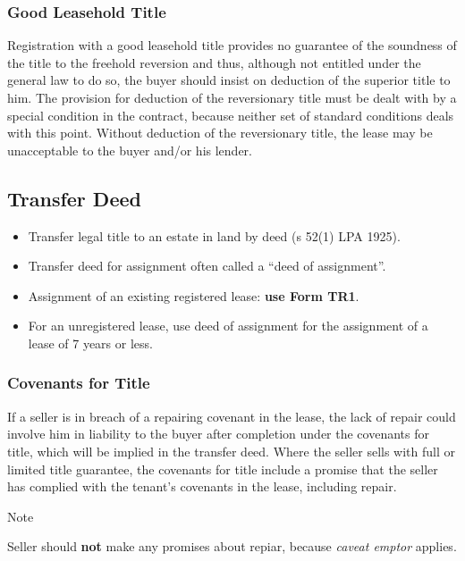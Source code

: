 \documentclass[
]{article}
\providecommand{\tightlist}{%
  \setlength{\itemsep}{0pt}\setlength{\parskip}{0pt}}
\newenvironment{env-ab94a4ec-2f9e-4d2f-94d1-74521d1a190e}
{
    \savenotes\tcolorbox[blanker,breakable,left=5pt,borderline west={2pt}{-4pt}{blue}]
}
{
    \endtcolorbox\spewnotes
}
\begin{document}
\hypertarget{good-leasehold-title}{%
\subsubsection{Good Leasehold Title}\label{good-leasehold-title}}

Registration with a good leasehold title provides no guarantee of the
soundness of the title to the freehold reversion and thus, although not
entitled under the general law to do so, the buyer should insist on
deduction of the superior title to him. The provision for deduction of
the reversionary title must be dealt with by a special condition in the
contract, because neither set of standard conditions deals with this
point. Without deduction of the reversionary title, the lease may be
unacceptable to the buyer and/or his lender.

\hypertarget{transfer-deed}{%
\subsection{Transfer Deed}\label{transfer-deed}}

\begin{itemize}
\tightlist
\item
  Transfer legal title to an estate in land by deed (s 52(1) LPA 1925).
\item
  Transfer deed for assignment often called a ``deed of assignment''.
\item
  Assignment of an existing registered lease: \textbf{use Form TR1}.
\item
  For an unregistered lease, use deed of assignment for the assignment
  of a lease of 7 years or less.
\end{itemize}

\hypertarget{covenants-for-title}{%
\subsubsection{Covenants for Title}\label{covenants-for-title}}

If a seller is in breach of a repairing covenant in the lease, the lack
of repair could involve him in liability to the buyer after completion
under the covenants for title, which will be implied in the transfer
deed. Where the seller sells with full or limited title guarantee, the
covenants for title include a promise that the seller has complied with
the tenant's covenants in the lease, including repair.

\begin{env-ab94a4ec-2f9e-4d2f-94d1-74521d1a190e}

Note

Seller should \textbf{not} make any promises about repiar, because
\emph{caveat emptor} applies.

\end{env-ab94a4ec-2f9e-4d2f-94d1-74521d1a190e}
\end{document}
